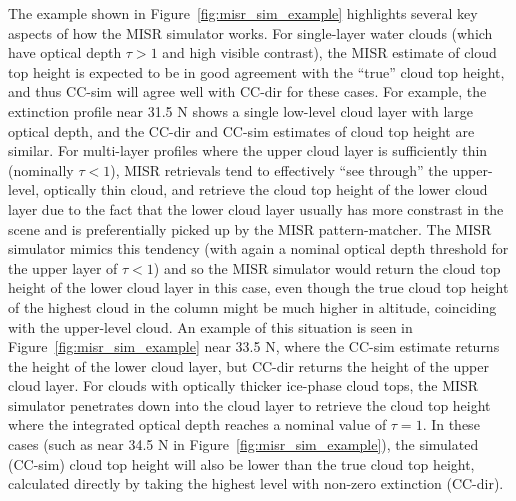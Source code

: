 The example shown in Figure~\ref{fig:misr_sim_example} highlights
several key aspects of how the MISR simulator works. For single-layer
water clouds (which have optical depth \(\tau > 1\) and high visible
contrast), the MISR estimate of cloud top height is expected to be in
good agreement with the ``true'' cloud top height, and thus CC-sim will
agree well with CC-dir for these cases. For example, the extinction
profile near 31.5 N shows a single low-level cloud layer with large
optical depth, and the CC-dir and CC-sim estimates of cloud top height
are similar. For multi-layer profiles where the upper cloud layer is
sufficiently thin (nominally \(\tau < 1\)), MISR retrievals tend to
effectively ``see through'' the upper-level, optically thin cloud, and
retrieve the cloud top height of the lower cloud layer due to the fact
that the lower cloud layer usually has more constrast in the scene and
is preferentially picked up by the MISR pattern-matcher. The MISR
simulator mimics this tendency (with again a nominal optical depth
threshold for the upper layer of \(\tau < 1\)) and so the MISR simulator
would return the cloud top height of the lower cloud layer in this case,
even though the true cloud top height of the highest cloud in the column
might be much higher in altitude, coinciding with the upper-level cloud.
An example of this situation is seen in
Figure~\ref{fig:misr_sim_example} near 33.5 N, where the CC-sim estimate
returns the height of the lower cloud layer, but CC-dir returns the
height of the upper cloud layer. For clouds with optically thicker
ice-phase cloud tops, the MISR simulator penetrates down into the cloud
layer to retrieve the cloud top height where the integrated optical
depth reaches a nominal value of \(\tau = 1\). In these cases (such as
near 34.5 N in Figure~\ref{fig:misr_sim_example}), the simulated
(CC-sim) cloud top height will also be lower than the true cloud top
height, calculated directly by taking the highest level with non-zero
extinction (CC-dir).

